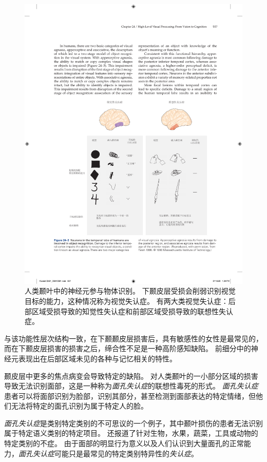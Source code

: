 \begin{figure}[htbp]
	\centering
	\includegraphics[width=1.0\linewidth]{chap24/fig_24_3}
	\caption{人类颞叶中的神经元参与物体识别。
		下颞皮层受损会削弱识别视觉目标的能力，这种情况称为视觉失认症。
		有两大类视觉失认症：后部区域受损导致的知觉性失认症和前部区域受损导致的联想性失认症。}
	\label{fig:24_3}
\end{figure}


与该功能性层次结构一致，在下颞颞皮层损害后，具有敏感性的女性是最常见的，而在下颞皮层损害的损害之后，缔合性不足是一种高阶感知缺陷。
前细分中的神经元表现出在后部区域未见的各种与记忆相关的特性。


颞皮层中更多的焦点病变会导致特定的缺陷。
对人类颞叶的一小部分区域的损害导致无法识别面部，这是一种称为\textit{面孔失认症}的联想性毒死的形式。
\textit{面孔失认症}患者可以将面部识别为脸部，识别其部分，甚至检测到面部表达的特定情绪，但他们无法将特定的面孔识别为属于特定人的脸。


\textit{面孔失认症}是类别特定类别的不可思议的一个例子，其中颞叶损伤的患者无法识别属于特定语义类别的特定项目。
还报道了针对生物，水果，蔬菜，工具或动物的特定类别的不症。
由于面部的明显行为意义以及人们认识到大量面孔的正常能力，\textit{面孔失认症}可能只是最常见的特定类别特异性的\textit{失认症}。



